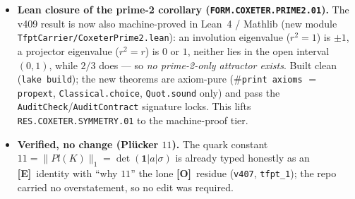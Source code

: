 \documentclass[11pt]{article}
\providecommand{\mE}{\textbf{[E]}}\providecommand{\mC}{\textbf{[C]}}
\providecommand{\mO}{\textbf{[O]}}\providecommand{\mX}{\textbf{[X]}}
\providecommand{\vref}[1]{\texttt{#1}}
\begin{document}
\begin{itemize}
\item \textbf{Lean closure of the prime-2 corollary (\texttt{FORM.COXETER.PRIME2.01}).} The v409 result is now
also machine-proved in Lean~4 / Mathlib (new module \texttt{TfptCarrier/CoxeterPrime2.lean}): an involution
eigenvalue ($r^2{=}1$) is $\pm1$, a projector eigenvalue ($r^2{=}r$) is $0$ or $1$, neither lies in the open
interval $(0,1)$, while $2/3$ does --- so \emph{no prime-2-only attractor exists}. Built clean
(\texttt{lake build}); the new theorems are axiom-pure ($\#$\texttt{print axioms} $=$ \texttt{propext},
\texttt{Classical.choice}, \texttt{Quot.sound} only) and pass the \texttt{AuditCheck}/\texttt{AuditContract}
signature locks. This lifts \texttt{RES.COXETER.SYMMETRY.01} to the machine-proof tier.
\item \textbf{Verified, no change (Pl\"ucker $11$).} The quark constant $11{=}\|Pl(K)\|_1{=}\det(\mathbf1|a|\sigma)$
is already typed honestly as an \mE\ identity with ``why $11$'' the lone \mO\ residue (\vref{v407}, \texttt{tfpt\_1});
the repo carried no overstatement, so no edit was required.
\end{itemize}
\end{document}
